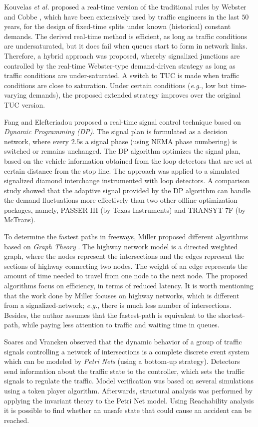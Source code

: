 \documentclass[10pt,onecolumn]{article}
\begin{document}
Kouvelas \textit{et al.} \cite{Kouvelas2011} proposed a real-time version of the traditional rules by Webster and Cobbe \cite{Webster1966}, which have been extensively used by traffic engineers in the last
$50$ years, for the design of fixed-time splits under known (historical) constant demands. The derived real-time method is efficient, as long as traffic conditions are undersaturated, but it does fail when queues start to form in network links. Therefore, a hybrid approach was proposed, whereby signalized junctions are controlled by the real-time Webster-type demand-driven strategy as long as traffic conditions are under-saturated. A switch to TUC is made when traffic conditions are close to saturation. Under certain conditions (\textit{e.g.}, low but time-varying demands), the proposed extended strategy improves over the original TUC version.


Fang and Elefteriadou \cite{Fang2008} proposed a real-time signal control technique based on \textit{Dynamic Programming (DP)}. The signal plan is formulated as a decision network, where every $2.5$s a signal phase (using NEMA phase numbering) is switched or remains unchanged.
The DP algorithm optimizes the signal plan, based on the vehicle information obtained from the loop detectors that are set at certain distance from the stop line. 
The approach was applied to a simulated signalized diamond interchange instrumented with loop detectors. A comparison study showed that the adaptive signal provided by the DP algorithm can handle the demand fluctuations more effectively than two other offline optimization packages, namely, PASSER III (by Texas Instruments) and TRANSYT-7F (by McTrans).

To determine the fastest paths in freeways, Miller proposed different algorithms based on \textit{Graph Theory} \cite{Miller2009}. 
The highway network model is a directed weighted graph, where the nodes represent the intersections and the edges represent the sections of highway connecting two nodes. The weight of an edge represents the amount of time needed to travel from one node to the next node. 
The proposed algorithms focus on efficiency, in terms of reduced latency. 
It is worth mentioning that the work done by Miller focuses on highway networks, which is different from a signalized-network; \textit{e.g.}, there is much less number of intersections. Besides, the author assumes that the fastest-path is equivalent to the shortest-path, while paying less attention to traffic and waiting time in queues.

Soares and Vrancken \cite{Soares2012} observed that the dynamic behavior of a group of traffic signals controlling a network of intersections is a complete discrete event system which can be modeled by \textit{Petri Nets} (using a bottom-up strategy).  
Detectors send information about the traffic state to the controller, which sets the traffic signals to regulate the traffic. 
Model verification was based on several simulations using a token player algorithm. Afterwards, structural analysis was performed by applying the invariant theory to the Petri Net model.
Using Reachability analysis it is possible to find whether an unsafe state that could cause an accident can be reached.
\end{document}
